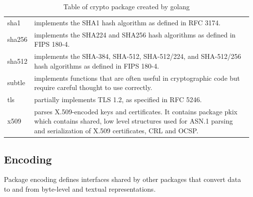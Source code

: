 \documentclass[
  digital, %
  notable,   %
  lof,     %
  lot,     %
]{fithesis3}
\begin{document}
\begin{table}[th]
\begin{tabular}{|p{1.5cm} p{10.5cm}|}
sha1 & implements the SHA1 hash algorithm as defined in RFC 3174.\\
sha256 & implements the SHA224 and SHA256 hash algorithms as defined in FIPS 180-4. \\
sha512 & implements the SHA-384, SHA-512, SHA-512/224, and SHA-512/256 hash algorithms as defined in FIPS 180-4.\\
subtle & implements functions that are often useful in cryptographic code but require careful thought to use correctly.\\
tls & partially implements TLS 1.2, as specified in RFC 5246. \\
x509 & parses X.509-encoded keys and certificates. It contains package pkix which contains shared, low level structures used for ASN.1 parsing and serialization of X.509 certificates, CRL and OCSP. \\ 
\hline
\end{tabular}
\caption{Table of crypto package created by golang} 
\label{table:crypto} 
\end{table}

\subsection{Encoding}
Package encoding defines interfaces shared by other packages that convert data to and from 
byte-level and textual representations.
\end{document}
